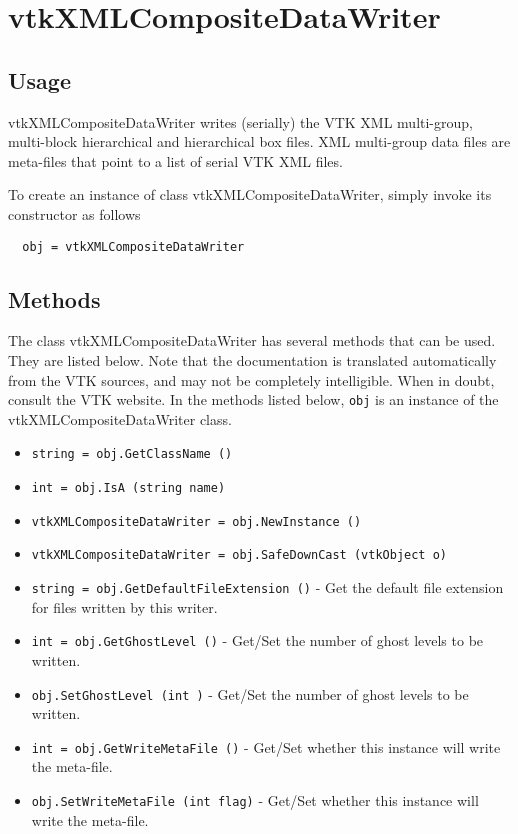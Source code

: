 \section{vtkXMLCompositeDataWriter}

\subsection{Usage}

 vtkXMLCompositeDataWriter writes (serially) the VTK XML multi-group,
 multi-block hierarchical and hierarchical box files. XML multi-group
 data files are meta-files that point to a list of serial VTK XML files.

To create an instance of class vtkXMLCompositeDataWriter, simply
invoke its constructor as follows
\begin{verbatim}
  obj = vtkXMLCompositeDataWriter
\end{verbatim}
\subsection{Methods}

The class vtkXMLCompositeDataWriter has several methods that can be used.
  They are listed below.
Note that the documentation is translated automatically from the VTK sources,
and may not be completely intelligible.  When in doubt, consult the VTK website.
In the methods listed below, \verb|obj| is an instance of the vtkXMLCompositeDataWriter class.
\begin{itemize}
\item  \verb|string = obj.GetClassName ()|

\item  \verb|int = obj.IsA (string name)|

\item  \verb|vtkXMLCompositeDataWriter = obj.NewInstance ()|

\item  \verb|vtkXMLCompositeDataWriter = obj.SafeDownCast (vtkObject o)|

\item  \verb|string = obj.GetDefaultFileExtension ()| -  Get the default file extension for files written by this writer.

\item  \verb|int = obj.GetGhostLevel ()| -  Get/Set the number of ghost levels to be written.

\item  \verb|obj.SetGhostLevel (int )| -  Get/Set the number of ghost levels to be written.

\item  \verb|int = obj.GetWriteMetaFile ()| -  Get/Set whether this instance will write the meta-file. 

\item  \verb|obj.SetWriteMetaFile (int flag)| -  Get/Set whether this instance will write the meta-file. 

\end{itemize}
